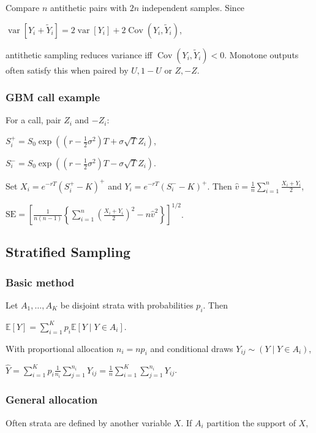 Compare $n$ antithetic pairs with $2n$ independent samples. Since

$\operatorname{var}[Y_i+\tilde{Y}_i]=2\operatorname{var}[Y_i]+2\operatorname{Cov}(Y_i,\tilde{Y}_i)$,

antithetic sampling reduces variance iff $\operatorname{Cov}(Y_i,\tilde{Y}_i)<0$. Monotone outputs often satisfy this when paired by $U,1-U$ or $Z,-Z$.

\subsubsection*{GBM call example}

For a call, pair $Z_i$ and $-Z_i$:

$S_i^+=S_0\exp\left((r-\frac12\sigma^2)T+\sigma\sqrt{T}Z_i\right)$,

$S_i^-=S_0\exp\left((r-\frac12\sigma^2)T-\sigma\sqrt{T}Z_i\right)$.

Set $X_i=e^{-rT}(S_i^+-K)^+$ and $Y_i=e^{-rT}(S_i^--K)^+$. Then
$\hat{v}=\frac{1}{n}\sum_{i=1}^n\frac{X_i+Y_i}{2}$,

$\mathrm{SE}=\left[\frac{1}{n(n-1)}\left\{\sum_{i=1}^n\left(\frac{X_i+Y_i}{2}\right)^2-n\hat{v}^2\right\}\right]^{1/2}$.

\subsection{Stratified Sampling}

\subsubsection*{Basic method}

Let $A_1,\ldots,A_K$ be disjoint strata with probabilities $p_i$. Then

$\mathbb{E}[Y]=\sum_{i=1}^Kp_i\mathbb{E}[Y\mid Y\in A_i]$.

With proportional allocation $n_i=np_i$ and conditional draws $Y_{ij}\sim (Y\mid Y\in A_i)$,

$\hat{Y}=\sum_{i=1}^Kp_i\frac{1}{n_i}\sum_{j=1}^{n_i}Y_{ij}=\frac{1}{n}\sum_{i=1}^K\sum_{j=1}^{n_i}Y_{ij}$.

\subsubsection*{General allocation}

Often strata are defined by another variable $X$. If $A_i$ partition the support of $X$,

